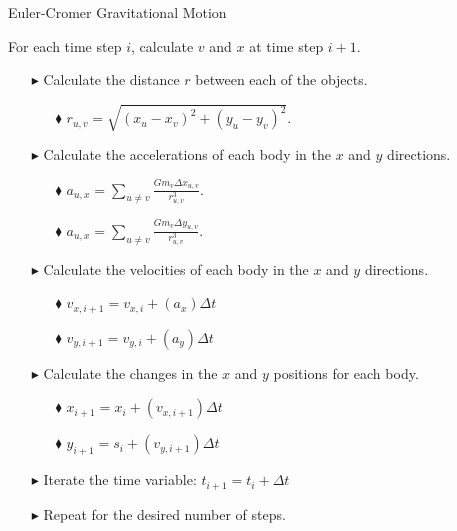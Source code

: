 \documentclass{article}
\renewcommand{\l}{\left}
\renewcommand{\r}{\right}
\begin{document}
\begin{algorithm}
	\caption{Euler-Cromer Gravitational Motion}
	\label{alg:Gravitational_Motion}
	\begin{algorithmic}
		\State For each time step $i$, calculate $v$ and $x$ at time step $i+1$.
			\begin{itemize}
				\item[$\blacktriangleright$] Calculate the distance $r$ between each of the objects.
				\begin{itemize}
					\item[$\blacklozenge$] $r_{u,v} = \sqrt{\l(x_u - x_v\r)^2 + \l(y_u - y_v\r)^2}$.
				\end{itemize}
				\item[$\blacktriangleright$] Calculate the accelerations of each body in the $x$ and $y$ directions.
				\begin{itemize}
					\item[$\blacklozenge$] $a_{u,x} = \sum_{u \neq v} \frac{Gm_v \Delta x_{u,v}}{r_{u,v}^3}$.
					\item[$\blacklozenge$] $a_{u,x} = \sum_{u \neq v} \frac{Gm_v \Delta y_{u,v}}{r_{u,v}^3}$.
				\end{itemize}
				\item[$\blacktriangleright$] Calculate the velocities of each body in the $x$ and $y$ directions.
				\begin{itemize}
					\item[$\blacklozenge$] $v_{x,i+1} = v_{x,i} + \l(a_x\r)\Delta t$
					\item[$\blacklozenge$] $v_{y,i+1} = v_{y,i} + \l(a_y\r)\Delta t$
				\end{itemize}
				\item[$\blacktriangleright$] Calculate the changes in the $x$ and $y$ positions for each body.
				\begin{itemize}
					\item[$\blacklozenge$] $x_{i+1} = x_{i} + \l(v_{x,i+1}\r)\Delta t$
					\item[$\blacklozenge$] $y_{i+1} = s_{i} + \l(v_{y,i+1}\r)\Delta t$
				\end{itemize}
				\item[$\blacktriangleright$] Iterate the time variable: $t_{i+1} = t_i + \Delta t$
				\item[$\blacktriangleright$] Repeat for the desired number of steps.
			\end{itemize}
	\end{algorithmic}
\end{algorithm}
\end{document}
